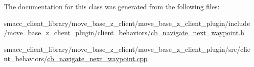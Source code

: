 The documentation for this class was generated from the following files\+:\begin{DoxyCompactItemize}
\item 
smacc\+\_\+client\+\_\+library/move\+\_\+base\+\_\+z\+\_\+client/move\+\_\+base\+\_\+z\+\_\+client\+\_\+plugin/include/move\+\_\+base\+\_\+z\+\_\+client\+\_\+plugin/client\+\_\+behaviors/\hyperlink{cb__navigate__next__waypoint_8h}{cb\+\_\+navigate\+\_\+next\+\_\+waypoint.\+h}\item 
smacc\+\_\+client\+\_\+library/move\+\_\+base\+\_\+z\+\_\+client/move\+\_\+base\+\_\+z\+\_\+client\+\_\+plugin/src/client\+\_\+behaviors/\hyperlink{cb__navigate__next__waypoint_8cpp}{cb\+\_\+navigate\+\_\+next\+\_\+waypoint.\+cpp}\end{DoxyCompactItemize}

